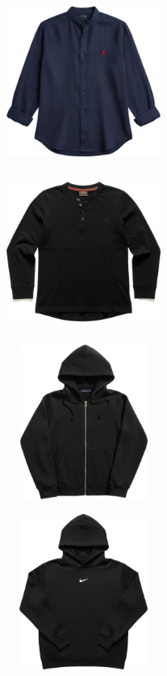 \documentclass[10pt]{article}
\begin{document}
\begin{minipage}[c][50.60mm][c]{50.60mm}\centering
\includegraphics[width=50.60mm,height=50.60mm,keepaspectratio]{assets/midlayer/button-up-navy.png}\
\end{minipage} \hspace*{6.00mm} \begin{minipage}[c][50.60mm][c]{50.60mm}\centering
\includegraphics[width=50.60mm,height=50.60mm,keepaspectratio]{assets/midlayer/black-half-button-long-sleeve.png}\
\end{minipage} \hspace*{6.00mm} \begin{minipage}[c][50.60mm][c]{50.60mm}\centering
\includegraphics[width=50.60mm,height=50.60mm,keepaspectratio]{assets/midlayer/black-hoodie-zip.png}\
\end{minipage} \hspace*{6.00mm} \begin{minipage}[c][50.60mm][c]{50.60mm}\centering
\includegraphics[width=50.60mm,height=50.60mm,keepaspectratio]{assets/midlayer/black-nike-hoodie.png}\
\end{minipage}\
\vspace*{6.00mm}\
\newpage
\end{document}

